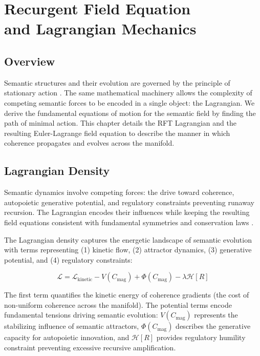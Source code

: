 \chapter{Recurgent Field Equation \\ and Lagrangian Mechanics}

\section{Overview}

Semantic structures and their evolution are governed by the principle of stationary action \autocite{GoldsteinPooleSafko2002, Arnold1989}. The same mathematical machinery allows the complexity of competing semantic forces to be encoded in a single object: the Lagrangian. We derive the fundamental equations of motion for the semantic field by finding the path of minimal action. This chapter details the RFT Lagrangian and the resulting Euler-Lagrange field equation to describe the manner in which coherence propagates and evolves across the manifold.

\section{Lagrangian Density}

Semantic dynamics involve competing forces: the drive toward coherence, autopoietic generative potential, and regulatory constraints preventing runaway recursion. The Lagrangian encodes their influences while keeping the resulting field equations consistent with fundamental symmetries and conservation laws \autocite{Lagrange1788, Euler1744, LandauLifshitz1975}.

The Lagrangian density captures the energetic landscape of semantic evolution with terms representing (1) kinetic flow, (2) attractor dynamics, (3) generative potential, and (4) regulatory constraints:

\begin{equation}
\mathcal{L} = \mathcal{L}_{\text{kinetic}} - V(C_{\text{mag}}) + \Phi(C_{\text{mag}}) - \lambda \mathcal{H}[R]
\end{equation}

The first term quantifies the kinetic energy of coherence gradients (the cost of non-uniform coherence across the manifold). The potential terms encode fundamental tensions driving semantic evolution: \(V(C_{\text{mag}})\) represents the stabilizing influence of semantic attractors, \(\Phi(C_{\text{mag}})\) describes the generative capacity for autopoietic innovation, and \(\mathcal{H}[R]\) provides regulatory humility constraint preventing excessive recursive amplification.

